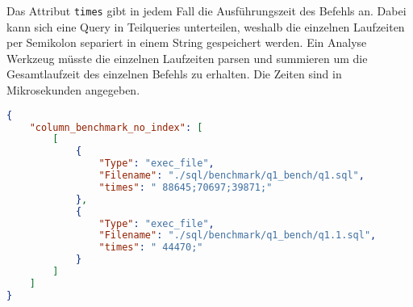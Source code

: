 Das Attribut \verb+times+ gibt in jedem Fall die Ausführungszeit des Befehls an.
Dabei kann sich eine Query in Teilqueries unterteilen, weshalb die einzelnen Laufzeiten
per Semikolon separiert in einem String gespeichert werden.
Ein Analyse Werkzeug müsste die einzelnen Laufzeiten parsen und summieren um die
Gesamtlaufzeit des einzelnen Befehls zu erhalten.
Die Zeiten sind in Mikrosekunden angegeben.



\begin{lstlisting}[language=json, caption={Aufbau der Log Datei}, label={exec:log-file}]
{
	"column_benchmark_no_index": [
		[
			{
				"Type": "exec_file",
				"Filename": "./sql/benchmark/q1_bench/q1.sql",
				"times": " 88645;70697;39871;"
			},
			{
				"Type": "exec_file",
				"Filename": "./sql/benchmark/q1_bench/q1.1.sql",
				"times": " 44470;"
			}
		]
	]
}
\end{lstlisting}


